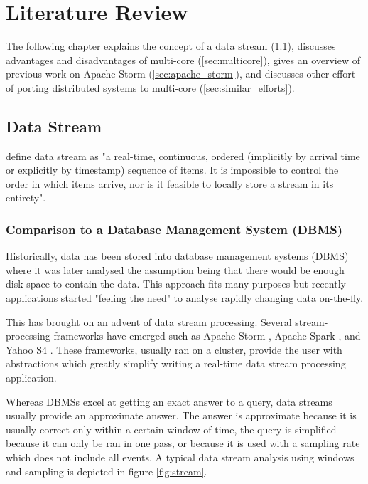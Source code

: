 \chapter{Literature Review}

The following chapter explains the concept of a data stream (\ref{sec:data_stream}), discusses advantages and disadvantages of multi-core (\ref{sec:multicore}), gives an overview of previous work on Apache Storm (\ref{sec:apache_storm}), and discusses other effort of porting distributed systems to multi-core (\ref{sec:similar_efforts}).

\section{Data Stream}
\label{sec:data_stream}

\citet{golab2003issues} define data stream as "a real-time, continuous, ordered (implicitly by arrival time or explicitly by timestamp) sequence of items. It is impossible to control the order in which items arrive, nor is it feasible to locally store a stream in its entirety".

\subsection{Comparison to a Database Management System (DBMS)}

Historically, data has been stored into database management systems (DBMS) where it was later analysed the assumption being that there would be enough disk space to contain the data. This approach fits many purposes but recently applications started "feeling the need" to analyse rapidly changing data on-the-fly.

This has brought on an advent of data stream processing. Several stream-processing frameworks have emerged such as Apache Storm \citep{ApacheStorm}, Apache Spark \citep{ApacheSpark}, and Yahoo S4 \citep{YahooS4}. These frameworks, usually ran on a cluster, provide the user with abstractions which greatly simplify writing a real-time data stream processing application.

Whereas DBMSs excel at getting an exact answer to a query, data streams usually provide an approximate answer. The answer is approximate because it is usually correct only within a certain window of time, the query is simplified because it can only be ran in one pass, or because it is used with a sampling rate which does not include all events. A typical data stream analysis using windows and sampling is depicted in figure \ref{fig:stream}.

